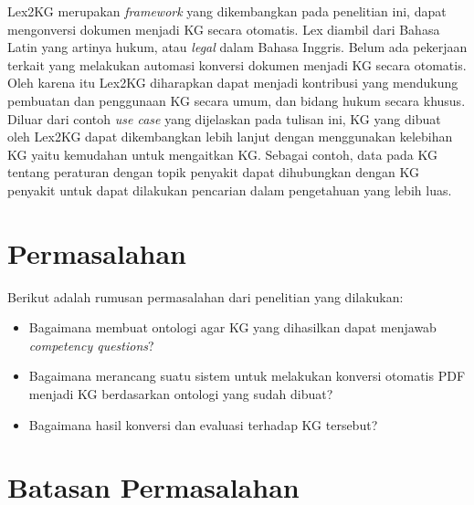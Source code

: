Lex2KG merupakan \textit{framework} yang dikembangkan pada penelitian ini, dapat mengonversi dokumen
menjadi KG secara otomatis. Lex diambil dari Bahasa Latin yang artinya hukum, atau \textit{legal}
dalam Bahasa Inggris. Belum ada pekerjaan terkait yang melakukan automasi konversi dokumen \legal
menjadi KG secara otomatis. Oleh karena itu Lex2KG diharapkan dapat menjadi kontribusi yang
mendukung pembuatan dan penggunaan KG secara umum, dan bidang hukum secara khusus. Diluar dari
contoh \textit{use case} yang dijelaskan pada tulisan ini, KG yang dibuat oleh Lex2KG dapat
dikembangkan lebih lanjut dengan menggunakan kelebihan KG yaitu kemudahan untuk mengaitkan KG.
Sebagai contoh, data pada KG tentang peraturan dengan topik penyakit dapat dihubungkan dengan KG
penyakit untuk dapat dilakukan pencarian dalam pengetahuan yang lebih luas.

\section{Permasalahan}
\label{sec:permasalahan}

Berikut adalah rumusan permasalahan dari penelitian yang dilakukan:
\begin{itemize}
  \item Bagaimana membuat ontologi agar KG yang dihasilkan dapat menjawab \textit{competency questions}?
  \item Bagaimana merancang suatu sistem untuk melakukan konversi otomatis PDF \legal menjadi KG
        berdasarkan ontologi yang sudah dibuat?
  \item Bagaimana hasil konversi dan evaluasi terhadap KG \legal tersebut?
\end{itemize}

\section{Batasan Permasalahan}
\label{sec:batasan-permasalahan}

